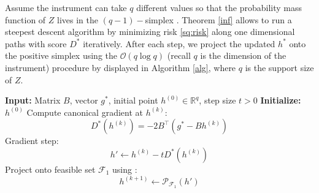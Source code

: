 \documentclass[12pt]{article}
\theoremstyle{thmstyleone}%
\theoremstyle{thmstyletwo}%
\theoremstyle{thmstylethree}%
\begin{document}
Assume the instrument can take $q$ different values so that the probability mass function of $Z$ lives in the $(q-1)-$simplex . Theorem \ref{inf} allows to run a steepest descent algorithm by minimizing risk \ref{sq:risk} along one dimensional paths with score $D^*$ iteratively. After each step, we project the updated $h^*$ onto the positive simplex using the $\mathcal{O}(q \log q)$ (recall $q$ is the dimension of the instrument) procedure by \citep{duchi2008efficient} displayed in Algorithm \ref{alg}, where $q$ is the support size of $Z$.  


\begin{algorithm}[h!]
	\caption{Projected canonical gradient descent on the simplex}\label{alg}
	\begin{algorithmic}[1]
		\State \textbf{Input:} Matrix $B$, vector $g^*$, initial point $h^{(0)} \in \mathbb{R}^q$, step size $t > 0$
		\State \textbf{Initialize:} $h^{(0)}$
		\Repeat
		\State Compute canonical gradient at $h^{(k)}$: \[
		D^*(h^{(k)}) = -2 B^\top (g^* - B h^{(k)})
		\]
		\State Gradient step: \[
		h' \gets h^{(k)}- t D^*(h^{(k)})
		\]
		\State Project onto feasible set $\mathcal{F}_1$ using \citep{duchi2008efficient}: \[
		h^{(k+ 1)}\gets \mathcal{P}_{\mathcal{F}_1}(h')
		\]
		
	\end{algorithmic}
\end{algorithm}
\end{document}
